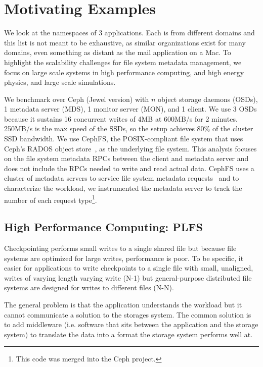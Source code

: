 \section{Motivating Examples}

We look at the namespaces of 3 applications.  Each is from different domains
and this list is not meant to be exhaustive, as similar organizations exist for
many domains, even something as distant as the mail application on a Mac. To
highlight the scalability challenges for file system metadata management, we
focus on large scale systems in high performance computing, and high energy
physics, and large scale simulations.

We benchmark over Ceph (Jewel version) with \(n\) object storage daemons
(OSDs), 1 metadata server (MDS), 1 monitor server (MON), and 1 client.  We use
3 OSDs because it sustains 16 concurrent writes of 4MB at 600MB/s for 2
minutes. 250MB/s is the max speed of the SSDs, so the setup achieves 80\% of
the cluster SSD bandwidth.  We use CephFS, the POSIX-compliant file system that
uses Ceph's RADOS object store~\cite{weil:osdi2006-ceph}, as the underlying
file system.  This analysis focuses on the file system metadata RPCs between
the client and metadata server and does not include the RPCs needed to write
and read actual data.  CephFS uses a cluster of metadata servers to service
file system metadata requests~\cite{weil:sc2004-dyn-metadata} and to
characterize the workload, we instrumented the metadata server to track the
number of each request type\footnote{This code was merged into the Ceph
project.}.

\subsection{High Performance Computing: PLFS}
\label{sec:plfs}
Checkpointing performs small writes to a single shared file but because
file systems are optimized for large writes, performance is poor. To be
specific, it easier for applications to write checkpoints to a single file with
small, unaligned, writes of varying length varying write (N-1) but
general-purpose distributed file systems are designed for writes to different
files (N-N).

The general problem is that the application understands the workload but it cannot
communicate a solution to the storages system. The common solution is to add
middleware (i.e. software that sits between the application and the storage
system) to translate the data into a format the storage system performs well
at. 


